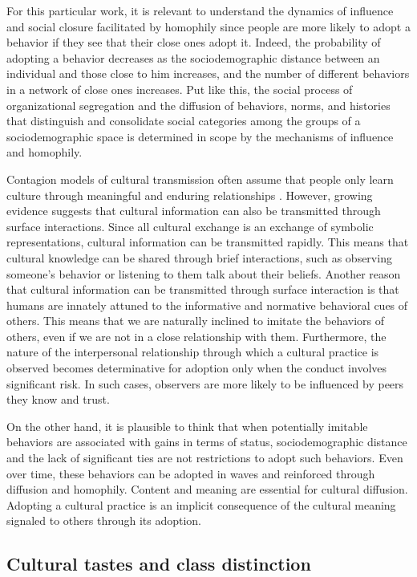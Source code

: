 For this particular work, it is relevant to understand the dynamics of influence and social closure facilitated by homophily since people are more likely to adopt a behavior if they see that their close ones adopt it. Indeed, the probability of adopting a behavior decreases as the sociodemographic distance between an individual and those close to him increases, and the number of different behaviors in a network of close ones increases. Put like this, the social process of organizational segregation and the diffusion of behaviors, norms, and histories that distinguish and consolidate social categories among the groups of a sociodemographic space is determined in scope by the mechanisms of influence and homophily.
\bigskip

Contagion models of cultural transmission often assume that people only learn culture through meaningful and enduring relationships \parencite{goldberg_beyond_2018}. However, growing evidence suggests that cultural information can also be transmitted through surface interactions. Since all cultural exchange is an exchange of symbolic representations, cultural information can be transmitted rapidly. This means that cultural knowledge can be shared through brief interactions, such as observing someone's behavior or listening to them talk about their beliefs. Another reason that cultural information can be transmitted through surface interaction is that humans are innately attuned to the informative and normative behavioral cues of others. This means that we are naturally inclined to imitate the behaviors of others, even if we are not in a close relationship with them. Furthermore, the nature of the interpersonal relationship through which a cultural practice is observed becomes determinative for adoption only when the conduct involves significant risk. In such cases, observers are more likely to be influenced by peers they know and trust. 
\bigskip

On the other hand, it is plausible to think that when potentially imitable behaviors are associated with gains in terms of status, sociodemographic distance and the lack of significant ties are not restrictions to adopt such behaviors. Even over time, these behaviors can be adopted in waves and reinforced through diffusion and homophily. Content and meaning are essential for cultural diffusion. Adopting a cultural practice is an implicit consequence of the cultural meaning signaled to others through its adoption.

\subsection{Cultural tastes and class distinction}

